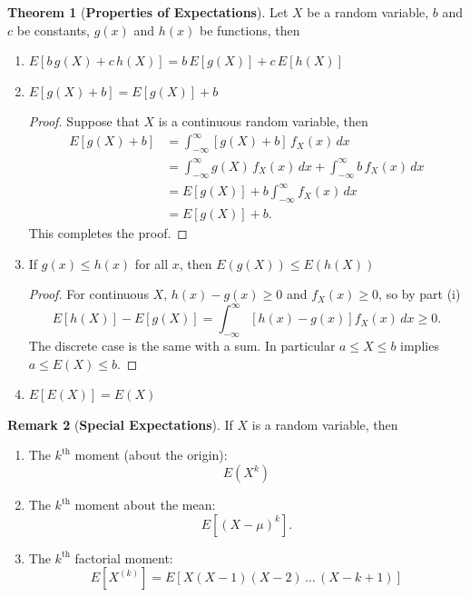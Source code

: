 \documentclass[12pt,a4paper]{report}
\theoremstyle{definition}
\newtheorem{thm}{Theorem}[section]
\newtheorem{remark}[thm]{Remark}
\theoremstyle{plain}
\theoremstyle{definition}
\begin{document}
\begin{thm}[\textbf{Properties of Expectations}]
Let $X$ be a random variable, $b$ and $c$ be constants, $g(x)$ and $h(x)$ be functions, then
\begin{enumerate}
\item[(i).] $E[b\, g(X)+c\, h(X)]=b\,E[g(X)] +c\,E[h(X)]$
\item[(ii).] $E[g(X) + b] =  E[g(X)] + b$
\begin{proof}
Suppose that $X$ is a continuous random variable, then 
\begin{align*}
E[g(X)  + b] & = \int^{\infty}_{-\infty} [g(X) + b]\, f_X(x)\, dx \\
& = \int^{\infty}_{-\infty}g(X)\, f_X(x)\, dx + \int^{\infty}_{-\infty} b\, f_X(x)\, dx\\
& = E[g(X)] + b\int^{\infty}_{-\infty} f_X(x)\, dx\\
& = E[g(X)] + b.
\end{align*}
This completes the proof.
\end{proof}


\item[(iii).] If $g(x)\leq h(x)$ for all $x$, then $E(g(X))\leq E(h(X))$
\begin{proof}
For continuous $X$, $h(x) - g(x)\geq 0$ and $f_X(x)\geq 0$, so by part (i)
\[E[h(X)] - E[g(X)] = \int_{-\infty}^{\infty}\left[h(x) - g(x)\right]f_X(x)\,dx\geq 0 .\]
The discrete case is the same with a sum. In particular $a\leq X\leq b$ implies
$a\leq E(X)\leq b$.
\end{proof}
\item[(iv).] $E[E(X)] = E(X)$
\end{enumerate}
\end{thm}




\begin{remark}[\textbf{Special Expectations}]
If $X$ is a random variable, then
\begin{enumerate}
\item The $k^{\text{th}}$ moment (about the origin): \[E(X^{k})\]
\item The $k^{\text{th}}$ moment about the mean: \[E\left[(X - \mu)^k\right].\]
\item The $k^{\text{th}}$ factorial moment: \[E\left[X^{(k)}\right]= E\left[X(X-1)(X-2)\, \ldots\, (X - k + 1)\right]\]
\end{enumerate}
\end{remark}
\end{document}
